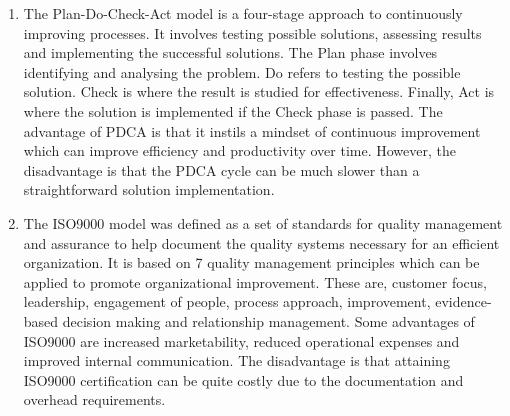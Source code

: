 \documentclass{article}
\begin{document}
\begin{enumerate}
\begin{enumerate}
    \item The Plan-Do-Check-Act model is a four-stage approach to continuously improving processes. It involves testing possible solutions, assessing results and implementing the successful solutions. The Plan phase involves identifying and analysing the problem. Do refers to testing the possible solution. Check is where the result is studied for effectiveness. Finally, Act is where the solution is implemented if the Check phase is passed. The advantage of PDCA is that it instils a mindset of continuous improvement which can improve efficiency and productivity over time. However, the disadvantage is that the PDCA cycle can be much slower than a straightforward solution implementation.
    
    \item The ISO9000 model was defined as a set of standards for quality management and assurance to help document the quality systems necessary for an efficient organization. It is based on 7 quality management principles which can be applied to promote organizational improvement. These are, customer focus, leadership, engagement of people, process approach, improvement, evidence-based decision making and relationship management. Some advantages of ISO9000 are increased marketability, reduced operational expenses and improved internal communication. The disadvantage is that attaining ISO9000 certification can be quite costly due to the documentation and overhead requirements.
   \end{enumerate}
   
\end{enumerate}
\end{document}

